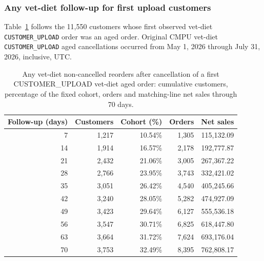 \clearpage
\subsubsection{Any vet-diet follow-up for first upload customers}
Table~\ref{tab:financial-opportunity-new-upload-any-vet-diet} follows the
11,550 customers whose first observed vet-diet
\texttt{CUSTOMER\_UPLOAD} order was an aged order. Original CMPU vet-diet
\texttt{CUSTOMER\_UPLOAD} aged cancellations occurred from
May 1, 2026 through July 31, 2026, inclusive, UTC.

\begin{table}[!htbp]
\centering
\caption{Any vet-diet non-cancelled reorders after cancellation of a first CUSTOMER\_UPLOAD vet-diet aged order: cumulative customers, percentage of the fixed cohort, orders and matching-line net sales through 70 days.}
\label{tab:financial-opportunity-new-upload-any-vet-diet}
\begin{tabular}{@{}rrrrr@{}}
\toprule
Follow-up (days) & Customers & Cohort (\%) & Orders & Net sales \\
\midrule
7 & 1,217 & 10.54\% & 1,305 & 115,132.09 \\
14 & 1,914 & 16.57\% & 2,178 & 192,777.87 \\
21 & 2,432 & 21.06\% & 3,005 & 267,367.22 \\
28 & 2,766 & 23.95\% & 3,743 & 332,421.02 \\
35 & 3,051 & 26.42\% & 4,540 & 405,245.66 \\
42 & 3,240 & 28.05\% & 5,282 & 474,927.09 \\
49 & 3,423 & 29.64\% & 6,127 & 555,536.18 \\
56 & 3,547 & 30.71\% & 6,825 & 618,447.80 \\
63 & 3,664 & 31.72\% & 7,624 & 693,176.04 \\
70 & 3,753 & 32.49\% & 8,395 & 762,808.17 \\
\bottomrule
\end{tabular}


\end{table}
